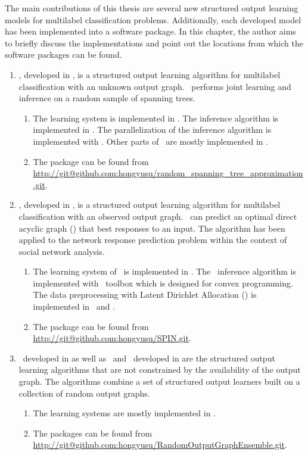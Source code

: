 {The main contributions of this thesis are several new structured output learning models for multilabel classification problems.
Additionally, each developed model has been implemented into a software package.
In this chapter, the author aims to briefly discuss the implementations and point out the locations from which the software packages can be found.

\begin{enumerate}
	\item \rta, developed in , is a structured output learning algorithm for multilabel classification with an unknown output graph. \rta\ performs joint learning and inference on a random sample of spanning trees.
	\begin{enumerate}
		\item The learning system is implemented in \matlab. The inference algorithm is implemented in \cpp. The parallelization of the inference algorithm is implemented with \openmp. Other parts of \rta\ are mostly implemented in \matlab.
		\item The package can be found from \url{http://git@github.com:hongyusu/random_spanning_tree_approximation.git}.
	\end{enumerate}
	
	\item \spin, developed in , is a structured output learning algorithm for multilabel classification with an observed output graph. \spin\ can predict an optimal direct acyclic graph (\daggraph) that best responses to an input. The algorithm has been applied to the network response prediction problem within the context of social network analysis.
	\begin{enumerate}
		\item The learning system of \spin\ is implemented in \matlab. The \sdp\ inference algorithm is implemented with \cvx\ toolbox which is designed for convex programming. The data preprocessing with Latent Dirichlet Allocation (\lda) \citep{Blei03latent} is implemented in \python\ and \matlab.
		\item The package can be found from \url{http://git@github.com:hongyusu/SPIN.git}.
	\end{enumerate}
	
	\item \mve\ developed in  as well as \amm\ and \mam\ developed in  are the structured output learning algorithms that are not constrained by the availability of the output graph. The algorithms combine a set of structured output learners built on a collection of random output graphs.
	\begin{enumerate}
		\item The learning systems are mostly implemented in \matlab.
		\item The packages can be found from \url{http://git@github.com:hongyusu/RandomOutputGraphEnsemble.git}.
	\end{enumerate}
\end{enumerate}




}
